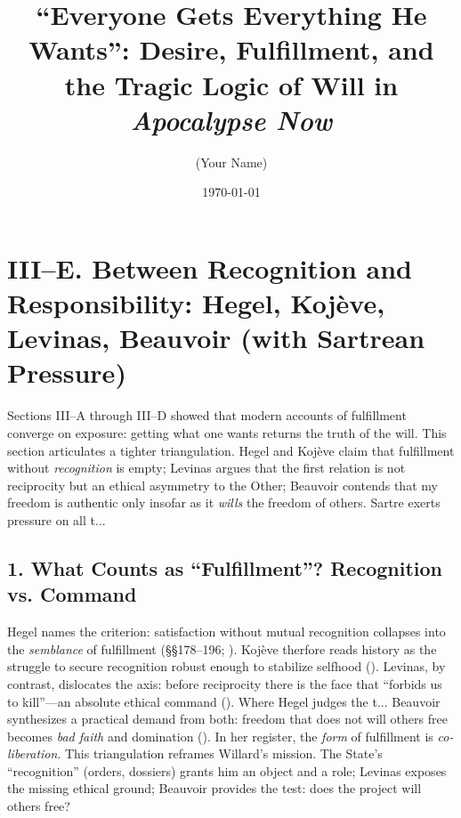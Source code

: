 \documentclass[12pt]{article}
\title{“Everyone Gets Everything He Wants”: Desire, Fulfillment, and the Tragic Logic of Will in \textit{Apocalypse Now}}
\author{(Your Name)}
\date{\today}
\begin{document}
\maketitle

\section*{III--E. Between Recognition and Responsibility: Hegel, Koj{\`e}ve, Levinas, Beauvoir (with Sartrean Pressure)}

Sections III--A through III--D showed that modern accounts of fulfillment converge on exposure: getting what one wants returns the truth of the will. This section articulates a tighter triangulation. Hegel and Koj{\`e}ve claim that fulfillment without \emph{recognition} is empty; Levinas argues that the first relation is not reciprocity but an ethical asymmetry to the Other; Beauvoir contends that my freedom is authentic only insofar as it \emph{wills} the freedom of others. Sartre exerts pressure on all t...
\subsection*{1. What Counts as ``Fulfillment''? Recognition vs. Command}
Hegel names the criterion: satisfaction without mutual recognition collapses into the \emph{semblance} of fulfillment (\S\S 178--196; \parencite{HegelPhenomenology1977}). Koj{\`e}ve therfore reads history as the struggle to secure recognition robust enough to stabilize selfhood (\parencite{KojeveIRH1980}). Levinas, by contrast, dislocates the axis: before reciprocity there is the face that ``forbids us to kill''---an absolute ethical command (\parencite[p.~199]{LevinasTI1969}). Where Hegel judges the t...
Beauvoir synthesizes a practical demand from both: freedom that does not will others free becomes \emph{bad faith} and domination (\parencite[p.~73]{Beauvoir1976}). In her register, the \emph{form} of fulfillment is \emph{co-liberation}. This triangulation reframes Willard’s mission. The State’s ``recognition'' (orders, dossiers) grants him an object and a role; Levinas exposes the missing ethical ground; Beauvoir provides the test: does the project will others free?
\end{document}
